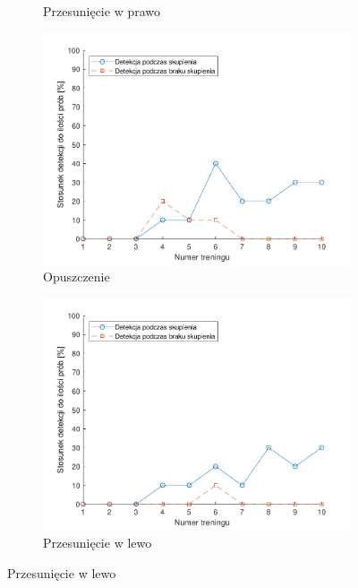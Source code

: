 \documentclass[skorowidz,skroty]{dyplomWEZUT}
\begin{document}
{\begin{figure}[htbp]
\begin{subfigure}{0.49\textwidth}
        \caption{Przesunięcie w prawo\label{fig:training_emotiv_right}}
        \end{subfigure}
        
        \medskip
        \begin{subfigure}{0.49\textwidth}
        \includegraphics[width=\linewidth]{graphic/down}
        \caption{Opuszczenie\label{fig:training_emotiv_down}}
        \end{subfigure}\hspace*{\fill}
        \begin{subfigure}{0.49\textwidth}
        \includegraphics[width=\linewidth]{graphic/left}
        \caption{Przesunięcie w lewo\label{fig:training_emotiv_left}}
        \end{subfigure}
        

\end{figure}}
\end{document}
